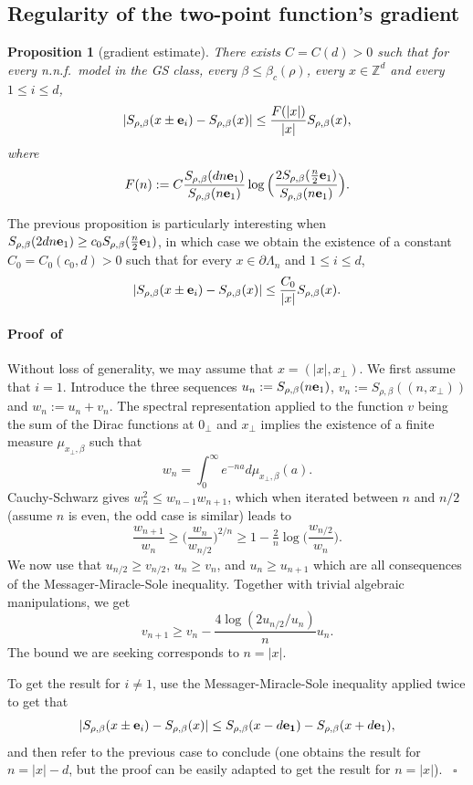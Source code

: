 \documentclass[a4paper,oneside,11pt]{article}
\def\Z{\mathbb{Z}}                          %
\newtheorem{proposition}[theorem]{Proposition}
\newcommand{\be}[1]{\begin{equation}\label{#1}}
\newcommand{\ee}{\end{equation}}
\numberwithin{equation}{section}
\numberwithin{equation}{section}
\numberwithin{equation}{section}
\newenvironment{proof}[1][\relax]%
  {\paragraph{Proof\ifx#1\relax\else~of #1\fi}}%
  {~\hfill$\square$\par\bigskip}
\def\Z{\mathbb{Z}}                          %
\def\be{\begin{equation}}
\def\ee{\end{equation}}
\begin{document}

\subsection{Regularity of the two-point function's gradient}\label{sec:3.3}

\begin{proposition}[gradient estimate]\label{prop:regularity gradient}
There exists $C=C(d)>0$ such that for {every n.n.f.~model in the GS class}, every $\beta\le\beta_c(\rho)$, every $x\in \Z^d$  and every $1\le i\le d$,
\be \label{eq_reg}
|S_{\rho,\beta}(x\pm{\bf e}_i)-S_{\rho,\beta}(x)|\le \frac{F(|x|)}{|x|}S_{\rho,\beta}(x),
\ee
where 
\be
F(n):=C\frac{S_{\rho,\beta}(dn{\bf e}_1)}{S_{\rho,\beta}(n{\bf e}_1)}\log\Big(\frac{2S_{\rho,\beta}(\tfrac{n}2{\bf e}_1)}{S_{\rho,\beta}(n{\bf e}_1)}\Big).
\ee
\end{proposition}

The previous proposition  is particularly interesting when
$
S_{\rho,\beta}(2dn{\bf e}_1)\ge c_0 S_{\rho,\beta}(\tfrac n2{\bf e}_1)
$, in which case we obtain the existence of a constant $C_0=C_0(c_0,d)>0$ such that for every $x\in\partial\Lambda_n$ and $1\le i\le d$,
\be\label{eq:gradient estimate}
|S_{\rho,\beta}(x\pm{\bf e}_i)-S_{\rho,\beta}(x)|\le \frac{C_0}{|x|}S_{\rho,\beta}(x).
\ee

\begin{proof}
Without loss of generality, we may assume that $x=(|x|,x_\perp)$. We first assume that $i=1$. 
Introduce the three sequences $u_n:=S_{\rho,\beta}(n{\bf e}_1)$, $v_n:=S_{\rho,\beta}((n,x_{\perp}))$ and $w_n:=u_n+v_n$. The spectral representation applied to the function $v$ being the sum of the Dirac functions at $0_\perp$ and $x_\perp$ implies  the existence of a finite measure $\mu_{x_\perp,\beta}$ such that 
\be
w_n=\int_0^\infty e^{-na}d\mu_{x_\perp,\beta}(a).
\ee
Cauchy-Schwarz gives $w_n^2\le w_{n-1}w_{n+1}$, which when 
iterated between $n$ and $n/2$ (assume $n$ is even, the odd case is similar) leads to
\be
\frac{w_{n+1}}{w_n}\ge \big(\frac{w_n}{w_{n/2}}\big)^{2/n}\ge 1-\tfrac2n\log\big(\frac{w_{n/2}}{w_n}\big).
\ee
We now use that $u_{n/2}\ge v_{n/2}$, $u_{n}\ge v_{n}$, and $u_n\ge u_{n+1}$ which are all consequences of the Messager-Miracle-Sole inequality. Together with trivial algebraic manipulations, we get
\be
v_{n+1}\ge v_n-\frac{4\log(2u_{n/2}/u_n)}{n} u_n.
\ee
The bound we are seeking corresponds to $n=|x|$.

To get the result for $i\ne 1$, use the Messager-Miracle-Sole inequality applied twice to get that
\be
|S_{\rho,\beta}(x\pm {\bf e}_i)-S_{\rho,\beta}(x)|\le S_{\rho,\beta}(x-d{\bf e_1})-S_{\rho,\beta}(x+d{\bf e}_1),
\ee
and then refer to the previous case to conclude (one obtains the result for $n=|x|-d$, but the proof can be easily adapted to get the result for $n=|x|$).
\end{proof}
\end{document}
